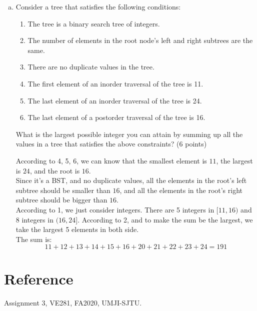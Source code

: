 \documentclass[11pt]{exam}
\begin{document}
\begin{enumerate}[a)]
\item
Consider a tree that satisfies the following conditions:
\begin{enumerate}[1.]
\item The tree is a binary search tree of integers.
\item The number of elements in the root node's left and right subtrees are the same.
\item There are no duplicate values in the tree.
\item The first element of an inorder traversal of the tree is 11.
\item The last element of an inorder traversal of the tree is 24.
\item The last element of a postorder traversal of the tree is 16.
\end{enumerate}

What is the largest possible integer you can attain by summing up all the values in a tree that satisfies the above constraints? (6 points)

\begin{solution}
\par
According to 4, 5, 6, we can know that the smallest element is $11$, the largest is $24$, and the root is $16$. \\
Since it's a BST, and no duplicate values, all the elements in the root's left subtree should be smaller than $16$, and all the elements in the root's right subtree should be bigger than $16$. \\
According to 1, we just consider integers. There are 5 integers in $[11,16)$ and 8 integers in $(16,24]$. According to 2, and to make the sum be the largest, we take the largest 5 elements in both side. \\
The sum is:
$$11+12+13+14+15+16+20+21+22+23+24 = 191$$
\end{solution}


\end{enumerate}

\section*{Reference}
Assignment 3, VE281, FA2020, UMJI-SJTU.
\end{document}
